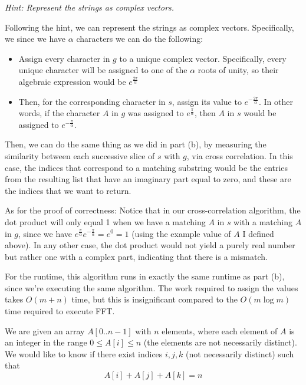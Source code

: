 \documentclass[11pt]{article}
\begin{document}
\begin{subparts}
\emph{Hint: Represent the strings as complex vectors.}

\begin{solution}
	Following the hint, we can represent the strings as complex vectors. Specifically, we since we have 
	$\alpha$ characters we can do the following: 
	\begin{itemize}
		\item Assign every character in $g$ to a unique complex vector. Specifically, every unique character
			will be assigned to one of the $\alpha$ roots of unity, so their algebraic expression would be 
			$e^{\frac{2\pi}{\alpha}}$
		\item Then, for the corresponding character in $s$, assign its value to $e^{-\frac{2\pi}{\alpha}}$. 
			In other words, if the character $A$ in $g$ was assigned to $e^{\frac{\pi}{\alpha}}$, then $A$ 
			in $s$ would be assigned to $e^{-\frac{\pi}{\alpha}}$. 
	\end{itemize}
	Then, we can do the same thing as we did in part (b), by measuring the similarity between each successive 
	slice of $s$ with $g$, via cross correlation. In this case, the indices that correspond to a matching
	substring would be the entries from the resulting list that have an imaginary part equal to zero, and these 
	are the indices that we want to return. 

	As for the proof of correctness: Notice that in our cross-correlation algorithm, the dot product 
	will only equal 1 when we have a matching $A$ in $s$ with a matching $A$ in $g$, since we have 
	$e^{\frac{\pi}{\alpha}} e^{-\frac{\pi}{\alpha}} = e^0 = 1$ (using the example value of $A$ I defined above).
	In any other case, the dot product would not yield a purely real number but rather one with a complex part, 
	indicating that there is a mismatch. 

	For the runtime, this algorithm runs in exactly the same runtime as part (b), since we're executing the
	same algorithm. The work required to assign the values takes $O(m+n)$ time, but this is insignificant 
	compared to the $O(m \log m)$ time required to execute FFT.
\end{solution}

\end{subparts}
\pagebreak
{}
We are given an array $A[0..n-1]$ with $n$ elements, where each
element of $A$ is an integer in the range $0 \le A[i] \le n$ (the elements are not necessarily distinct).
We would like to know if there exist indices $i,j,k$ (not necessarily distinct) such that
$$A[i]+A[j]+A[k]=n$$
\end{document}
